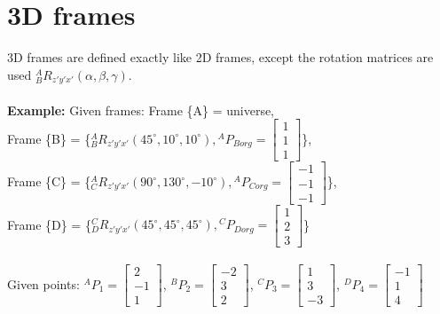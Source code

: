 \documentclass{article}
\begin{document}
\section{3D frames}
3D frames are defined exactly like 2D frames, except the rotation matrices are used ${}^{A}_{B}R_{z'y'x'}(\alpha,\beta,\gamma)$. \\\\
\textbf{Example: }
Given frames: Frame \{A\} = universe,\\ 
Frame \{B\} = \{${}^{A}_{B}R_{z'y'x'}(45^\circ,10^\circ,10^\circ) ,{}^{A}P_{Borg}=\begin{bmatrix}
1 \\
1 \\
1
\end{bmatrix} $\},\\
Frame \{C\} = \{${}^{A}_{C}R_{z'y'x'}(90^\circ,130^\circ,-10^\circ) ,{}^{A}P_{Corg}=\begin{bmatrix}
-1  \\
-1  \\
-1
\end{bmatrix} $\},\\
Frame \{D\} = \{${}^{C}_{D}R_{z'y'x'}(45^\circ,45^\circ,45^\circ) ,{}^{C}P_{Dorg}=\begin{bmatrix}
1  \\
2  \\
3
\end{bmatrix} $\}\\\\
Given points: ${}^{A}P_{1}=\begin{bmatrix}
2  \\
-1 \\
1
\end{bmatrix}$, ${}^{B}P_{2}=\begin{bmatrix}
-2  \\
3\\
2
\end{bmatrix}$, ${}^{C}P_{3}=\begin{bmatrix}
1  \\
3 \\
-3
\end{bmatrix}$, ${}^{D}P_{4}=\begin{bmatrix}
-1  \\
1 \\
4
\end{bmatrix}$\\
\end{document}
